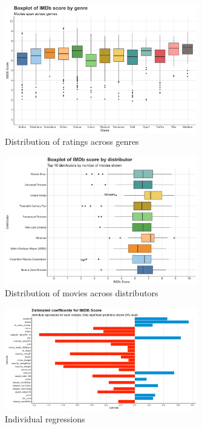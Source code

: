 \documentclass[12pt,a4paper]{article}
\begin{document}
\begin{appendices}
    \begin{figure}[h]
        \centering
        \includegraphics[width=0.75\textwidth]{genre_imdb_score.png}
        \caption{Distribution of ratings across genres}
        \label{fig:genre-bar}
    \end{figure}

    \begin{figure}[h]
        \centering
        \includegraphics[width=0.75\textwidth]{distributor_imdb_score.png}
        \caption{Distribution of movies across distributors}
        \label{fig:distributor-bar}
    \end{figure}

    \begin{figure}[h]
        \centering
        \includegraphics[width=0.75\textwidth]{individual_regressions.png}
        \caption{Individual regressions}
        \label{fig:individual-coefficients}
    \end{figure}


\end{appendices}
\end{document}
